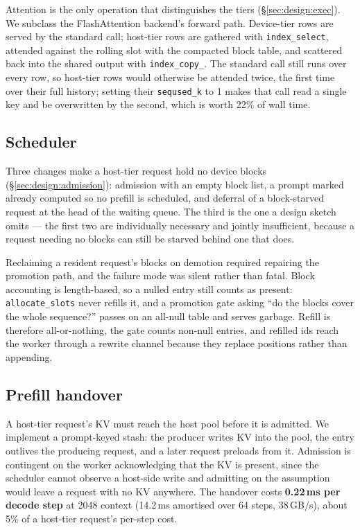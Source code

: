Attention is the only operation that distinguishes the tiers
(\S\ref{sec:design:exec}). We subclass the FlashAttention backend's forward
path. Device-tier rows are served by the standard call; host-tier rows are
gathered with \texttt{index\_select}, attended against the rolling slot with the
compacted block table, and scattered back into the shared output with
\texttt{index\_copy\_}. The standard call still runs over every row, so
host-tier rows would otherwise be attended twice, the first time over their full
history; setting their \texttt{seqused\_k} to 1 makes that call read a single key
and be overwritten by the second, which is worth 22\% of wall time.

\subsection{Scheduler}
\label{sec:impl:sched}

Three changes make a host-tier request hold no device blocks
(\S\ref{sec:design:admission}): admission with an empty block list, a prompt
marked already computed so no prefill is scheduled, and deferral of a
block-starved request at the head of the waiting queue. The third is the one a
design sketch omits --- the first two are individually necessary and jointly
insufficient, because a request needing no blocks can still be starved behind
one that does.

Reclaiming a resident request's blocks on demotion required repairing the
promotion path, and the failure mode was silent rather than fatal. Block
accounting is length-based, so a nulled entry still counts as present:
\texttt{allocate\_slots} never refills it, and a promotion gate asking ``do the
blocks cover the whole sequence?'' passes on an all-null table and serves
garbage. Refill is therefore all-or-nothing, the gate counts non-null entries,
and refilled ids reach the worker through a rewrite channel because they replace
positions rather than appending.

\subsection{Prefill handover}
\label{sec:impl:stash}

A host-tier request's KV must reach the host pool before it is admitted. We
implement a prompt-keyed stash: the producer writes KV into the pool, the entry
outlives the producing request, and a later request preloads from it. Admission
is contingent on the worker acknowledging that the KV is present, since the
scheduler cannot observe a host-side write and admitting on the assumption would
leave a request with no KV anywhere. The handover costs \textbf{0.22\,ms per
decode step} at 2048 context (14.2\,ms amortised over 64 steps, 38\,GB/s), about
5\% of a host-tier request's per-step cost.

